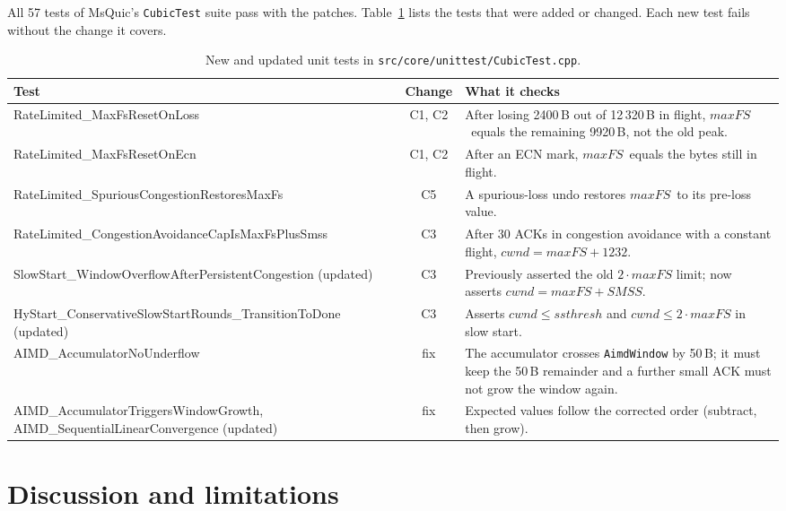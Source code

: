 \documentclass[11pt,a4paper]{article}
\newcommand{\maxfs}{\ensuremath{\mathit{maxFS}}}
\newcommand{\cwnd}{\ensuremath{\mathit{cwnd}}}
\newcommand{\ssthresh}{\ensuremath{\mathit{ssthresh}}}
\newcommand{\smss}{\ensuremath{\mathit{SMSS}}}
\begin{document}
All 57 tests of MsQuic's \texttt{CubicTest} suite pass with the patches.
Table~\ref{tab:tests} lists the tests that were added or changed. Each new
test fails without the change it covers.

\begin{table}[ht]
\centering
\small
\caption{New and updated unit tests in \texttt{src/core/unittest/CubicTest.cpp}.}
\label{tab:tests}
\begin{tabularx}{\textwidth}{@{}>{\raggedright\arraybackslash\ttfamily\footnotesize}p{5.6cm} c X@{}}
\toprule
\normalfont\small Test & Change & What it checks \\
\midrule
RateLimited\_\-MaxFsResetOnLoss & C1, C2 &
  After losing 2400\,B out of 12\,320\,B in flight, \maxfs\ equals the remaining
  9920\,B, not the old peak. \\
RateLimited\_\-MaxFsResetOnEcn & C1, C2 &
  After an ECN mark, \maxfs\ equals the bytes still in flight. \\
RateLimited\_\-SpuriousCongestion\-RestoresMaxFs & C5 &
  A spurious-loss undo restores \maxfs\ to its pre-loss value. \\
RateLimited\_\-CongestionAvoidance\-CapIsMaxFsPlusSmss & C3 &
  After 30 ACKs in congestion avoidance with a constant flight,
  $\cwnd = \maxfs + 1232$. \\
SlowStart\_\-WindowOverflowAfter\-PersistentCongestion \normalfont(updated) & C3 &
  Previously asserted the old $2\cdot\maxfs$ limit; now asserts
  $\cwnd = \maxfs + \smss$. \\
HyStart\_\-ConservativeSlowStart\-Rounds\_TransitionToDone \normalfont(updated) & C3 &
  Asserts $\cwnd \le \ssthresh$ and $\cwnd \le 2\cdot\maxfs$ in slow start. \\
AIMD\_\-AccumulatorNoUnderflow & fix &
  The accumulator crosses \texttt{AimdWindow} by 50\,B; it must keep the 50\,B
  remainder and a further small ACK must not grow the window again. \\
AIMD\_\-AccumulatorTriggersWindowGrowth, AIMD\_\-SequentialLinearConvergence \normalfont(updated) & fix &
  Expected values follow the corrected order (subtract, then grow). \\
\bottomrule
\end{tabularx}
\end{table}

\section{Discussion and limitations}
\label{sec:disc}
\end{document}
